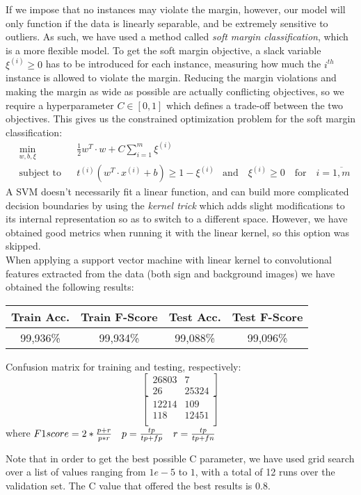 If we impose that no instances may violate the margin, however, our model will only function if the data is linearly separable, and be extremely sensitive to outliers. As such, we have used a method called \textit{soft margin classification}, which is a more flexible model. To get the soft margin objective, a slack variable $\xi^{(i)} \geq 0$ has to be introduced for each instance, measuring how much the $i^{th}$ instance is allowed to violate the margin. Reducing the margin violations and making the margin as wide as possible are actually conflicting objectives, so we require a hyperparameter $C \in [0,1]$ which defines a trade-off between the two objectives. This gives us the constrained optimization problem for the soft margin classification:
 \begin{equation}
\begin{aligned}
& \underset{w,b,\xi}{\text{min}}
& & \frac{1}{2} w^T \cdot w + C \sum_{i=1}^{m} \xi^{(i)}\\
& \text{subject to}
& & t^{(i)} (w^T \cdot x^{(i)} + b) \geq 1-\xi^{(i)} & \text{and} \quad \xi^{(i)} \geq 0 \quad \text{for} \quad i=\overline{1,m}
\end{aligned}
\end{equation}
A SVM doesn't necessarily fit a linear function, and can build more complicated decision boundaries by using the \textit{kernel trick} which adds slight modifications to its internal representation so as to switch to a different space. However, we have obtained good metrics when running it with the linear kernel, so this option was skipped.\\
When applying a support vector machine with linear kernel to convolutional features extracted from the data (both sign and background images) we have obtained the following results:

\begin{center}
 \begin{tabular}{||c | c | c | c||} 
 \hline
 Train Acc. & Train F-Score & Test Acc. & Test F-Score \\ [0.5ex] 
 \hline
 99,936\% & 99,934\% & 99,088\%  & 99,096\% \\ 
 \hline
\end{tabular}
\end{center}
\begin{center}
Confusion matrix for training and testing, respectively:
\[
\begin{bmatrix}
26803 & 7 \\
26 & 25324
\end{bmatrix}
\]
\quad
\[
\begin{bmatrix}
12214 & 109 \\
118 & 12451 \\
\end{bmatrix}
\]
where $F1\-score = 2*\frac{p+r}{p*r} \quad p=\frac{tp}{tp+fp} \quad r=\frac{tp}{tp+fn}$
\end{center}
Note that in order to get the best possible C parameter, we have used grid search over a list of values ranging from $1e-5$ to $1$, with a total of 12 runs over the validation set. The C value that offered the best results is $0.8$.

